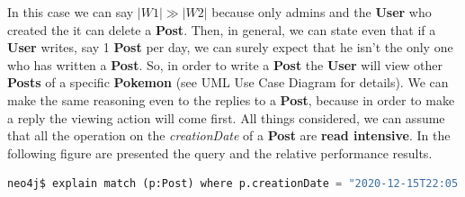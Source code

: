 In this case we can say $|W1| \gg |W2|$ because only admins and the \textbf{User} who created the it can delete a \textbf{Post}. Then, in general, we can state even that if a \textbf{User} writes, say 1 \textbf{Post} per day, we can surely expect that he isn't the only one who has written a \textbf{Post}. So, in order to write a \textbf{Post} the \textbf{User} will view other \textbf{Posts} of a specific \textbf{Pokemon} (see UML Use Case Diagram for details). We can make the same reasoning even to the replies to a \textbf{Post}, because in order to make a reply the viewing action will come first. All things considered, we can assume that all the operation on the \textit{creationDate} of a \textbf{Post} are \textbf{read intensive}. In the following figure are presented the query and the relative performance results.

\begin{lstlisting}[language=python]
	neo4j$ explain match (p:Post) where p.creationDate = "2020-12-15T22:05:32.382000000" return p
\end{lstlisting}

